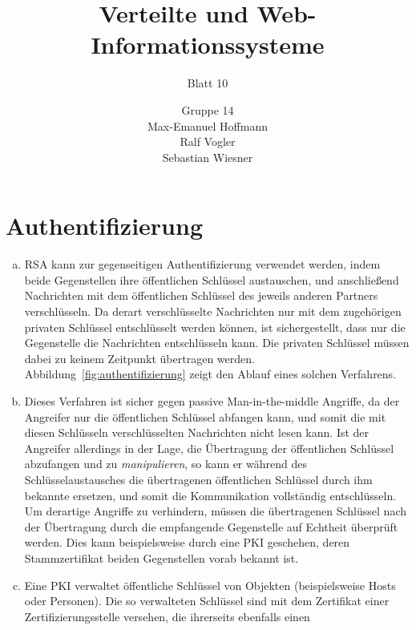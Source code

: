 \documentclass[11pt,a4paper]{scrartcl}
\begin{document}
\author{Gruppe 14\\Max-Emanuel Hoffmann\\Ralf Vogler\\Sebastian Wiesner}
\title{Verteilte und Web-Informationssysteme}
\subtitle{Blatt 10}

\maketitle

\setcounter{section}{1}

\section{Authentifizierung}

\begin{enumerate}[a)]
\item RSA kann zur gegenseitigen Authentifizierung verwendet werden, indem
  beide Gegenstellen ihre öffentlichen Schlüssel austauschen, und anschließend
  Nachrichten mit dem öffentlichen Schlüssel des jeweils anderen Partners
  verschlüsseln.  Da derart verschlüsselte Nachrichten nur mit dem zugehörigen
  privaten Schlüssel entschlüsselt werden können, ist sichergestellt, dass nur
  die Gegenstelle die Nachrichten entschlüsseln kann.  Die privaten Schlüssel
  müssen dabei zu keinem Zeitpunkt übertragen werden.
  Abbildung~\ref{fig:authentifizierung} zeigt den Ablauf eines solchen
  Verfahrens.
\item Dieses Verfahren ist sicher gegen passive Man-in-the-middle Angriffe, da
  der Angreifer nur die öffentlichen Schlüssel abfangen kann, und somit die mit
  diesen Schlüsseln verschlüsselten Nachrichten nicht lesen kann.  Ist der
  Angreifer allerdings in der Lage, die Übertragung der öffentlichen Schlüssel
  abzufangen und zu \emph{manipulieren}, so kann er während des
  Schlüsselaustausches die übertragenen öffentlichen Schlüssel durch ihm
  bekannte ersetzen, und somit die Kommunikation vollständig entschlüsseln.  Um
  derartige Angriffe zu verhindern, müssen die übertragenen Schlüssel nach der
  Übertragung durch die empfangende Gegenstelle auf Echtheit überprüft werden.
  Dies kann beispielsweise durch eine PKI geschehen, deren Stammzertifikat
  beiden Gegenstellen vorab bekannt ist.
\item Eine PKI verwaltet öffentliche Schlüssel von Objekten (beispielsweise
  Hosts oder Personen).  Die so verwalteten Schlüssel sind mit dem Zertifikat
  einer Zertifizierungsstelle versehen, die ihrerseits ebenfalls einen

\end{enumerate}
\end{document}
